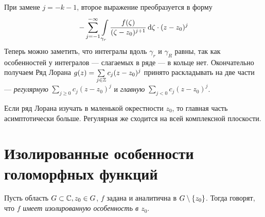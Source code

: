 \documentclass[a4paper]{report}
\begin{document}
{{    При замене $j = -k - 1$, второе выражение преобразуется в форму
    \[-\sum\limits_{j = -1}^{-\infty}\int\limits_{\gamma_r}\frac{f(\zeta)}{(\zeta - z_0)^{j+1}}\operatorname{d}\!\zeta\cdot (z - z_0)^j\]
    Теперь можно заметить, что интегралы вдоль $\gamma_r$ и $\gamma_R$ равны, так как особенностей у интегралов --- слагаемых в ряде --- в кольце нет. Окончательно получаем
    }
    }
    Ряд Лорана $g(z) = \sum\limits_{j \in \mathbb{Z}}c_j(z - z_0)^j$ принято раскладывать на две части --- \emph{регулярную} $\sum\limits_{j \ge 0}c_j (z - z_0)^j$ и \emph{главную} $\sum\limits_{j < 0} c_j (z - z_0)^j$.

    Если ряд Лорана изучать в маленькой окрестности $z_0$, то главная часть асимптотически больше.
    Регулярная же сходится на всей комплексной плоскости. %
    \section{Изолированные особенности голоморфных функций}
    Пусть область $G \subset \mathbb{C}, z_0 \in G$, $f$ задана и аналитична в $G \setminus \{z_0\}$.
    Тогда говорят, что $f$ \emph{имеет изолированную особенность в $z_0$}.
\end{document}
